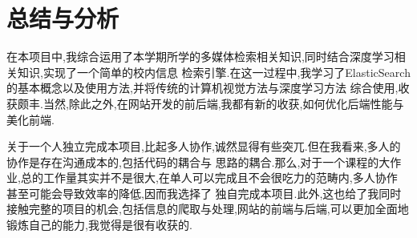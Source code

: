 \documentclass[a4paper]{article}
\begin{document}
    \section{总结与分析}
在本项目中,我综合运用了本学期所学的多媒体检索相关知识,同时结合深度学习相关知识,实现了一个简单的校内信息
检索引擎.在这一过程中,我学习了ElasticSearch的基本概念以及使用方法,并将传统的计算机视觉方法与深度学习方法
综合使用,收获颇丰.当然,除此之外,在网站开发的前后端,我都有新的收获,如何优化后端性能与美化前端.

关于一个人独立完成本项目,比起多人协作,诚然显得有些突兀.但在我看来,多人的协作是存在沟通成本的,包括代码的耦合与
思路的耦合.那么,对于一个课程的大作业,总的工作量其实并不是很大,在单人可以完成且不会很吃力的范畴内,多人协作
甚至可能会导致效率的降低,因而我选择了
独自完成本项目.此外,这也给了我同时接触完整的项目的机会,包括信息的爬取与处理,网站的前端与后端,可以更加全面地
锻炼自己的能力,我觉得是很有收获的.

    \newpage
    
    
\end{document}
